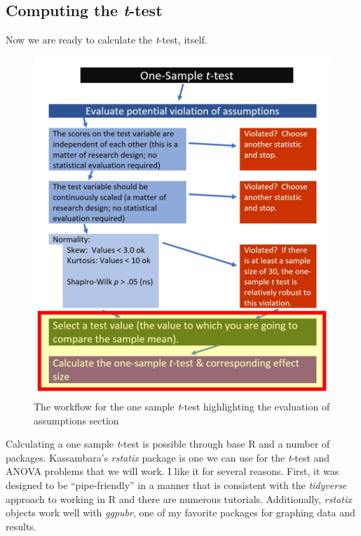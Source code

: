 \documentclass[
  11pt,
]{book}
\begin{document}
\hypertarget{computing-the-t-test}{%
\subsection{\texorpdfstring{Computing the \emph{t}-test}{Computing the t-test}}\label{computing-the-t-test}}

Now we are ready to calculate the \emph{t}-test, itself.

\begin{figure}
\centering
\includegraphics{images/ttests/OneSampleT.jpg}
\caption{The workflow for the one sample \emph{t}-test highlighting the evaluation of assumptions section}
\end{figure}

Calculating a one sample \emph{t}-test is possible through base R and a number of packages. Kassambara's \citeyearpar{kassambara_pipe-friendly_nodate} \emph{rstatix} package is one we can use for the \emph{t}-test and ANOVA problems that we will work. I like it for several reasons. First, it was designed to be ``pipe-friendly'' in a manner that is consistent with the \emph{tidyverse} approach to working in R and there are numerous tutorials. Additionally, \emph{rstatix} objects work well with \emph{ggpubr}, one of my favorite packages for graphing data and results.
\end{document}
